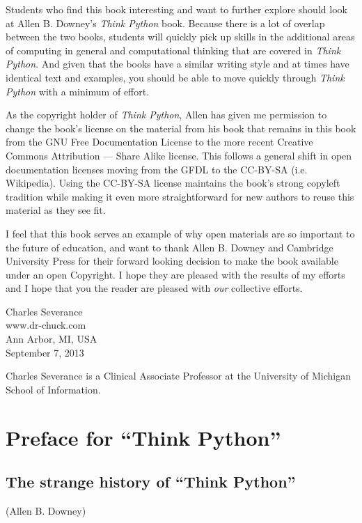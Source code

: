 \documentclass[11pt]{book}
\begin{document}
Students who find this book interesting and want to further explore
should look at Allen B. Downey's \emph{Think Python} book.  Because there
is a lot of overlap between the two books,
students will quickly pick up skills in the additional
areas of computing in general and computational thinking 
that are covered in \emph{Think Python}.
And given that the books have a similar writing style and at times
have identical text and examples, you should be 
able to move quickly through \emph{Think Python} with a minimum of effort.

As the copyright holder of \emph{Think Python},
Allen has given me permission to change the book's license 
on the material from his book that remains in this book
from the
GNU Free Documentation License 
to the more recent
Creative Commons Attribution --- Share Alike
license.
This follows a general shift in open documentation licenses moving 
from the GFDL to the CC-BY-SA (i.e. Wikipedia).
Using the CC-BY-SA license maintains the book's 
strong copyleft tradition while making it even more straightforward 
for new authors to reuse this material as they see fit.

I feel that this book serves an example of why open 
materials are so important to the future of education,
and want to thank Allen B. Downey and Cambridge University
Press for their forward looking decision to make the book available
under an open Copyright.   I hope they are pleased with the 
results of my efforts and I hope that you the reader are pleased with
\emph{our} collective efforts.

Charles Severance\\
www.dr-chuck.com\\
Ann Arbor, MI, USA\\
September 7, 2013

Charles Severance is a 
Clinical Associate Professor 
at the University of Michigan School of Information.

\section*{Preface for ``Think Python''}

\subsection*{The strange history of ``Think Python''}

(Allen B. Downey)
\end{document}
